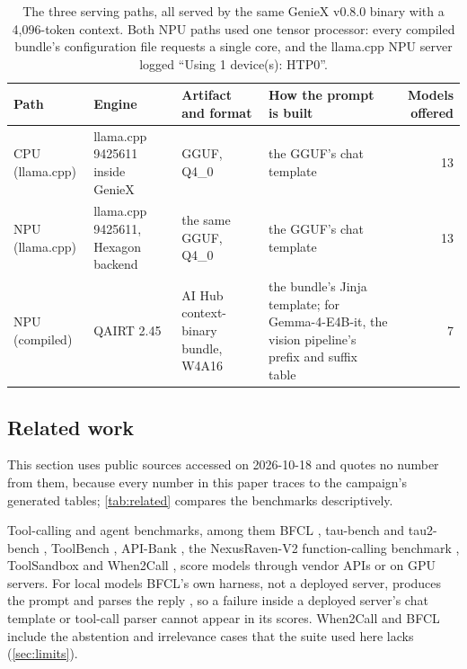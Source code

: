 \documentclass[11pt]{article}
\begin{document}
\begin{table}[tbp]
\centering
\caption{The three serving paths, all served by the same GenieX v0.8.0 binary with a 4,096-token context. Both NPU paths used one tensor processor: every compiled bundle's configuration file requests a single core, and the llama.cpp NPU server logged ``Using 1 device(s): HTP0''.}
\label{tab:paths}
\small
\begin{tabularx}{\linewidth}{@{}lLLLr@{}}
\toprule
Path & Engine & Artifact and format & How the prompt is built & Models offered \\
\midrule
CPU (llama.cpp) & llama.cpp 9425611 inside GenieX & GGUF, Q4\_0 & the GGUF's chat template & 13 \\
NPU (llama.cpp) & llama.cpp 9425611, Hexagon backend & the same GGUF, Q4\_0 & the GGUF's chat template & 13 \\
NPU (compiled) & QAIRT 2.45 & AI Hub context-binary bundle, W4A16 & the bundle's Jinja template; for Gemma-4-E4B-it, the vision pipeline's prefix and suffix table & 7 \\
\bottomrule
\end{tabularx}
\end{table}

\subsection{Related work}\label{sec:related}

This section uses public sources accessed on 2026-10-18 and quotes no number from them, because every number in this paper traces to the campaign's generated tables; \cref{tab:related} compares the benchmarks descriptively.

Tool-calling and agent benchmarks, among them BFCL \citep{bfcl2025,bfclLeaderboard}, tau-bench \citep{taubench} and tau2-bench \citep{tau2bench}, ToolBench \citep{toolbench}, API-Bank \citep{apibank}, the NexusRaven-V2 function-calling benchmark \citep{nexusraven}, ToolSandbox \citep{toolsandbox} and When2Call \citep{when2call}, score models through vendor APIs or on GPU servers. For local models BFCL's own harness, not a deployed server, produces the prompt and parses the reply \citep{bfclLeaderboard}, so a failure inside a deployed server's chat template or tool-call parser cannot appear in its scores. When2Call and BFCL include the abstention and irrelevance cases that the suite used here lacks (\cref{sec:limits}).
\end{document}
